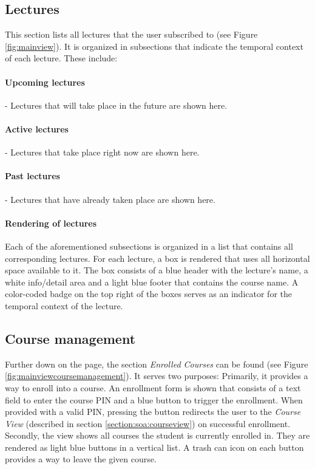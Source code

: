 \subsection{Lectures}
\label{section:soa:mainview:lectures}
This section lists all lectures that the user subscribed to (see Figure \ref{fig:mainview}). It is organized in subsections that indicate the temporal context of each lecture. These include:

\paragraph{Upcoming lectures} - Lectures that will take place in the future are shown here.
\paragraph{Active lectures} - Lectures that take place right now are shown here.
\paragraph{Past lectures} - Lectures that have already taken place are shown here.

\paragraph{Rendering of lectures}

Each of the aforementioned subsections is organized in a list that contains all corresponding lectures. For each lecture, a box is rendered that uses all horizontal space available to it. The box consists of a blue header with the lecture's name, a white info/detail area and a light blue footer that contains the course name.
A color-coded badge on the top right of the boxes serves as an indicator for the temporal context of the lecture.



\subsection{Course management}

Further down on the page, the section \emph{Enrolled Courses} can be found (see Figure \ref{fig:mainviewcoursemanagement}). It serves two purposes: Primarily, it provides a way to enroll into a course. An enrollment form is shown that consists of a text field to enter the course PIN and a blue button to trigger the enrollment. When provided with a valid PIN, pressing the button redirects the user to the \emph{Course View} (described in section \ref{section:soa:courseview})  on successful enrollment.
Secondly, the view shows all courses the student is currently enrolled in. They are rendered as light blue buttons in a vertical list. A trash can icon on each button provides a way to leave the given course.

